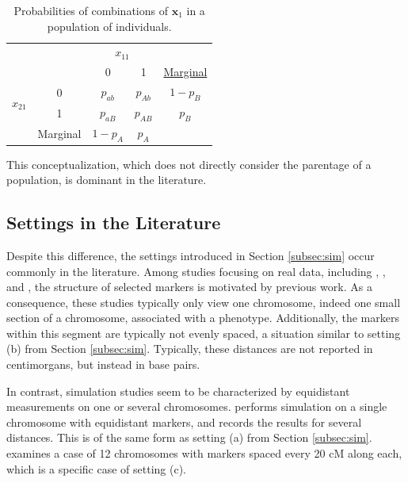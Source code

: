 \documentclass{article}
\newcommand{\ve}[1]{\mathbf{#1}}           %
\begin{document}
\begin{table}[!ht]
  \centering
  \begin{tabular}{c c| c c| c}
    & \multicolumn{1}{c}{} & \multicolumn{2}{c}{$x_{11}$} & \\ \cline{3-4}
    & & 0 & 1 & \underline{Marginal} \\ \cline{2-4}
    \multirow{2}{*}{$x_{21}$} & \multicolumn{1}{|c|}{0} & $p_{ab}$ & $p_{Ab}$ & $1-p_B$ \\
    & \multicolumn{1}{|c|}{1} & $p_{aB}$ & $p_{AB}$ & $p_B$ \\ \cline{2-4}
    & \multicolumn{1}{c}{Marginal} & \multicolumn{1}{c}{$1 - p_A$} & \multicolumn{1}{c}{$p_A$} &  \\ 
  \end{tabular}
  \caption{Probabilities of combinations of $\ve{x}_1$ in a population of individuals.}
  \label{tab:r2}
\end{table}

This conceptualization, which does not directly consider the parentage of a population, is dominant in the literature.

\subsection{Settings in the Literature} \label{subsec:inlit}

Despite this difference, the settings introduced in Section \ref{subsec:sim} occur commonly in the literature. Among studies focusing on real data, including \cite{Galwey2009}, \cite{nyholt2004}, and \cite{Salyakina2005}, the structure of selected markers is motivated by previous work. As a consequence, these studies typically only view one chromosome, indeed one small section of a chromosome, associated with a phenotype. Additionally, the markers within this segment are typically not evenly spaced, a situation similar to setting (b) from Section \ref{subsec:sim}. Typically, these distances are not reported in centimorgans, but instead in base pairs.

In contrast, simulation studies seem to be characterized by equidistant measurements on one or several chromosomes. \cite{cheverud2001} performs simulation on a single chromosome with equidistant markers, and records the results for several distances. This is of the same form as setting (a) from Section \ref{subsec:sim}. \cite{LanderBotstein1989} examines a case of 12 chromosomes with markers spaced every 20 cM along each, which is a specific case of setting (c).
\end{document}
